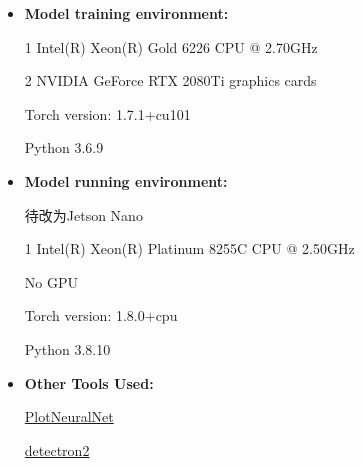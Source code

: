\begin{itemize}
    \item \textbf{Model training environment: }
    
    1 Intel(R) Xeon(R) Gold 6226 CPU @ 2.70GHz

    2 NVIDIA GeForce RTX 2080Ti graphics cards

    Torch version: 1.7.1+cu101

    Python 3.6.9
    \item \textbf{Model running environment: }

    待改为Jetson Nano

    1 Intel(R) Xeon(R) Platinum 8255C CPU @ 2.50GHz

    No GPU

    Torch version: 1.8.0+cpu

    Python 3.8.10

    \item \textbf{Other Tools Used: }
    
    \href{https://github.com/HarisIqbal88/PlotNeuralNet}{PlotNeuralNet} \cite{plotNeuralNet}

    \href{https://github.com/facebookresearch/detectron2}{detectron2} \cite{wu2019detectron2}


\end{itemize}


\clearpage